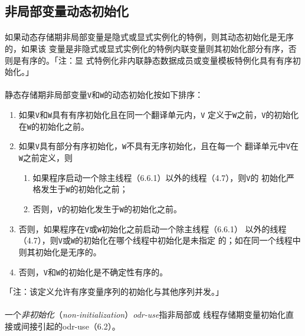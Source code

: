 \subsection{非局部变量动态初始化}
\paragraph{}
如果动态存储期非局部变量是隐式或显式实例化的特例，则其动态初始化是无序的，如果该
变量是非隐式或显式实例化的特例内联变量则其初始化部分有序，否则是有序的。「注：显
式特例化非内联静态数据成员或变量模板特例化具有有序初始化。」

\paragraph{}
静态存储期非局部变量\texttt{V}和\texttt{W}的动态初始化按如下排序：
\begin{enumerate}
  \item{如果\texttt{V}和\texttt{W}具有有序初始化且在同一个翻译单元内，\texttt{V}
    定义于\texttt{W}之前，\texttt{V}的初始化在\texttt{W}的初始化之前。}
  \item{如果\texttt{V}具有部分有序初始化，\texttt{W}不具有无序初始化，且在每一个
    翻译单元中\texttt{V}在\texttt{W}之前定义，则
    \begin{enumerate}
      \item{如果程序启动一个除主线程（6.6.1）以外的线程（4.7），则\texttt{V}的
        初始化严格发生于\texttt{W}的初始化之前；}
      \item{否则，\texttt{V}的初始化发生于\texttt{W}的初始化之前。}
  \end{enumerate}}
  \item{否则，如果程序在\texttt{V}或\texttt{W}初始化之前启动一个除主线程（6.6.1）
    以外的线程（4.7），则\texttt{V}或\texttt{W}的初始化在哪个线程中初始化是未指定
    的；如在同一个线程中则其初始化是无序的。}
  \item{否则，\texttt{V}和\texttt{W}的初始化是不确定性有序的。}
\end{enumerate}
「注：该定义允许有序变量序列的初始化与其他序列并发。」

\paragraph{}
一个\textit{非初始化}（\textit{non-initialization}）\textit{odr-use}指非局部或
线程存储期变量初始化直接或间接引起的odr-use（6.2）。

